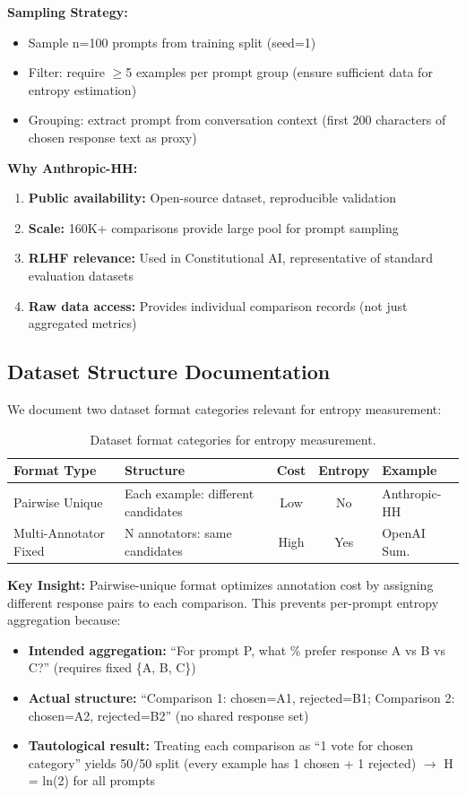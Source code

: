 \textbf{Sampling Strategy:}
\begin{itemize}
\item Sample n=100 prompts from training split (seed=1)
\item Filter: require $\geq$5 examples per prompt group (ensure sufficient data for entropy estimation)
\item Grouping: extract prompt from conversation context (first 200 characters of chosen response text as proxy)
\end{itemize}

\textbf{Why Anthropic-HH:}
\begin{enumerate}
\item \textbf{Public availability:} Open-source dataset, reproducible validation
\item \textbf{Scale:} 160K+ comparisons provide large pool for prompt sampling
\item \textbf{RLHF relevance:} Used in Constitutional AI, representative of standard evaluation datasets
\item \textbf{Raw data access:} Provides individual comparison records (not just aggregated metrics)
\end{enumerate}

\subsection{Dataset Structure Documentation}

We document two dataset format categories relevant for entropy measurement:

\begin{table}[h]
\centering
\caption{Dataset format categories for entropy measurement.}
\label{tab:dataset-formats}
\begin{tabular}{lp{2.5cm}ccp{2cm}}
\toprule
\textbf{Format Type} & \textbf{Structure} & \textbf{Cost} & \textbf{Entropy} & \textbf{Example} \\
\midrule
Pairwise Unique & Each example: different candidates & Low & No & Anthropic-HH \\
Multi-Annotator Fixed & N annotators: same candidates & High & Yes & OpenAI Sum. \\
\bottomrule
\end{tabular}
\end{table}

\textbf{Key Insight:} Pairwise-unique format optimizes annotation cost by assigning different response pairs to each comparison. This prevents per-prompt entropy aggregation because:
\begin{itemize}
\item \textbf{Intended aggregation:} ``For prompt P, what \% prefer response A vs B vs C?'' (requires fixed \{A, B, C\})
\item \textbf{Actual structure:} ``Comparison 1: chosen=A1, rejected=B1; Comparison 2: chosen=A2, rejected=B2'' (no shared response set)
\item \textbf{Tautological result:} Treating each comparison as ``1 vote for chosen category'' yields 50/50 split (every example has 1 chosen + 1 rejected) $\rightarrow$ H = ln(2) for all prompts
\end{itemize}

